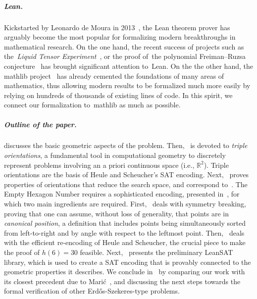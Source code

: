 \subparagraph*{Lean.} Kickstarted by Leonardo de Moura in 2013~\cite{demouraLeanTheoremProver2015}, the Lean theorem prover has arguably become the most popular for formalizing modern breakthroughs in mathematical research.
On the one hand, the recent success of projects such as the~\emph{Liquid Tensor Experiment}~\cite{Castelvecchi2021}, or the proof of~the polynomial Freiman–Ruzsa conjecture~\cite{gowers2023conjecture, slomanATeamMathProves2023} has brought significant attention to~Lean. %
On the the other hand, the \textsf{mathlib} project~\cite{The_mathlib_Community_2020} has already cemented the foundations of many areas of mathematics, thus allowing modern results to be formalized much more easily by relying on hundreds of thousands of existing lines of code. In this spirit, we connect our formalization to~\textsf{mathlib} as much as possible.

\subparagraph*{Outline of the paper.}
 discusses the basic geometric aspects of the problem.  Then,~ is devoted to \emph{triple orientations}, a fundamental tool in computational geometry to discretely represent problems involving an a priori continuous space (i.e., $\mathbb{R}^2$).
 Triple orientations are the basis of Heule and Scheucher's SAT encoding.
 Next,~ proves properties of orientations that reduce the search space,
and correspond to~.
The Empty Hexagon Number requires a sophisticated encoding, presented in~, for which two main ingredients are required. First,~ deals with symmetry breaking, proving that one can assume, without loss of generality, that points are in \emph{canonical position}, a definition that includes points being simultaneously sorted from left-to-right and by angle with respect to the leftmost point.
Then,~ deals with the efficient re-encoding of Heule and Scheucher, the crucial piece to make the proof of $h(6) = 30$ feasible. Next,~ presents the preliminary \textsf{LeanSAT} library, which is used to create a SAT encoding that is provably connected to the geometric properties it describes. We conclude in~ by comparing our work with its closest precedent due to Marić~\cite{19maric_fast_formal_proof_erdos_szekeres_conjecture_convex_polygons_most_six_points}, and discussing the next steps towards the formal verification of other Erd\H{o}s-Szekeres-type problems.

